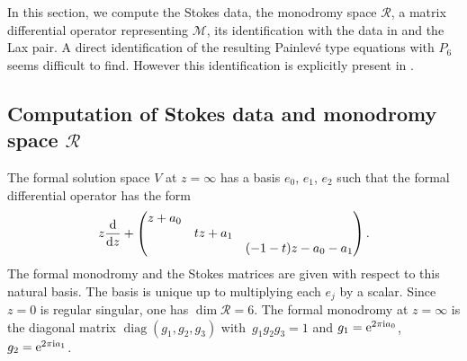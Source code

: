 \documentclass[pdftex]{sigma}
\numberwithin{equation}{section}
\begin{document}
 In this section, we compute the Stokes data, the monodromy space $\mathcal{R}$, a matrix differential operator
 representing $\mathcal{M}$, its identification with the data in \cite{D-G,H, Maz} and the Lax pair.
 A direct identification of the resulting Painlev\'e type equations with $P_6$ seems difficult to find. However
 this identification is explicitly present in \cite{H, Maz}.

 \subsection[Computation of Stokes data and monodromy space R]{Computation of Stokes data and monodromy space $\boldsymbol{\mathcal{R}}$}

The formal solution space $V$ at $z=\infty$ has a basis $e_0$, $e_1$, $e_2$ such that the formal differential operator has the form
\[ z\frac{{\rm d}}{{\rm d}z}+\begin{pmatrix} z+a_0 & & \\ &tz +a_1& \\ & &(-1-t)z-a_0-a_1 \end{pmatrix}.\]
The formal monodromy and the Stokes matrices are given with respect to this natural basis.
The basis is unique up to multiplying each $e_j$ by a scalar. Since $z=0$ is regular singular, one has $\dim \mathcal{R}=6$.
 The formal monodromy at $z=\infty$ is the diagonal matrix $\operatorname{diag}(g_1,g_2,g_3)$
 with~${g_1g_2g_3=1}$ and $g_1={\rm e}^{2\pi {\rm i} a_0}$, $g_2={\rm e}^{2\pi {\rm i} a_1}$.
\end{document}
